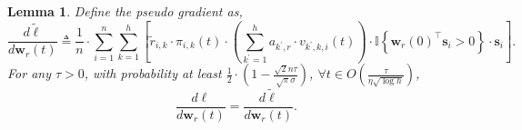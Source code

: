 \documentclass[10pt]{article}
\def\rvs{{\mathbf{s}}}
\def\rvw{{\mathbf{w}}}
\newtheorem{lem}{Lemma}
\def\sI{{\mathbb{I}}}
\begin{document}
\begin{lem}
\label{lem:gradient_upper_bound}
	Define the pseudo gradient as,
\begin{equation*}
	\frac{d \tilde{\ell}}{d \rvw_r(t)} \triangleq \frac{1}{n} \cdot \sum\limits_{i=1}^{n}{ \sum\limits_{k=1}^{h}{ \left[ \tilde{r}_{i,k} \cdot \pi_{i,k}(t) \cdot \left( \sum\limits_{k^\prime = 1}^{h}{ a_{k^\prime,r}  \cdot v_{k^\prime,k,i}(t) } \right) \cdot \sI\left\{ \rvw_r(0)^\top \rvs_i > 0 \right\} \cdot \rvs_i \right] } }.
\end{equation*}
	For any $\tau > 0$, with probability at least $\frac{1}{2} \cdot \left( 1 - \frac{\sqrt{2}n\tau}{\sqrt{\pi}\sigma} \right)$, $\forall t \in O\left(\frac{\tau}{\eta  \sqrt{\log{h}}}\right)$,
\begin{equation}
	\frac{d\ell}{d \rvw_r(t)} = \frac{d \tilde{\ell}}{d \rvw_r(t)}.
\end{equation}
\end{lem}
\end{document}
